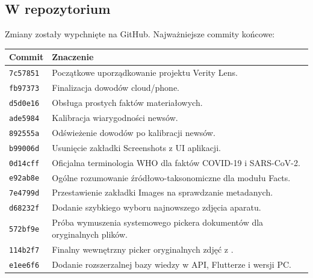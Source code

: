 \documentclass[12pt,a4paper]{article}
\begin{document}
\subsection{W repozytorium}
Zmiany zostały wypchnięte na GitHub.
Najważniejsze commity końcowe:
\begin{center}
\footnotesize
\begin{tabularx}{\textwidth}{p{}Y}
\toprule
Commit & Znaczenie \\
\midrule
\texttt{7c57851} & Początkowe uporządkowanie projektu Verity Lens. \\
\texttt{fb97373} & Finalizacja dowodów cloud/phone. \\
\texttt{d5d0e16} & Obsługa prostych faktów materiałowych. \\
\texttt{ade5984} & Kalibracja wiarygodności newsów. \\
\texttt{892555a} & Odświeżenie dowodów po kalibracji newsów. \\
\texttt{b99006d} & Usunięcie zakładki Screenshots z UI aplikacji. \\
\texttt{0d14cff} & Oficjalna terminologia WHO dla faktów COVID-19 i SARS-CoV-2. \\
\texttt{e92ab8e} & Ogólne rozumowanie źródłowo-taksonomiczne dla modułu Facts. \\
\texttt{7e4799d} & Przestawienie zakładki Images na sprawdzanie metadanych. \\
\texttt{d68232f} & Dodanie szybkiego wyboru najnowszego zdjęcia aparatu. \\
\texttt{572bf9e} & Próba wymuszenia systemowego pickera dokumentów dla oryginalnych plików. \\
\texttt{114b2f7} & Finalny wewnętrzny picker oryginalnych zdjęć z . \\
\texttt{e1ee6f6} & Dodanie rozszerzalnej bazy wiedzy w API, Flutterze i wersji PC. \\
\bottomrule
\end{tabularx}
\end{center}
\end{document}

